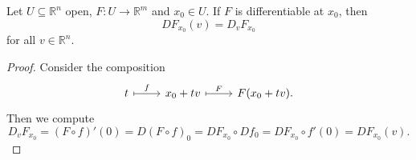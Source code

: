\begin{proposition}
	Let $U \subseteq \mathbb{R}^n$ open, $F : U \to \mathbb{R}^m$ and $x_0 \in U$. If $F$ is differentiable at $x_0$, then 
	\begin{equation*}
		DF_{x_0}(v) = D_vF_{x_0}
	\end{equation*}
	\noindent for all $v \in \mathbb{R}^n$.
\end{proposition}

\begin{proof}
	Consider the composition
	\begin{equation*}
		\begin{tikzcd}
			t \arrow[r,maps to,"f"] & x_0 + tv \arrow[r,maps to,"F"] & F(x_0 + tv).
		\end{tikzcd}
	\end{equation*}
	Then we compute
	\begin{equation*}
		D_vF_{x_0} = (F \circ f)'(0) = D(F \circ f)_0 = DF_{x_0} \circ Df_0 = DF_{x_0} \circ f'(0) = DF_{x_0}(v).
	\end{equation*}
\end{proof}

